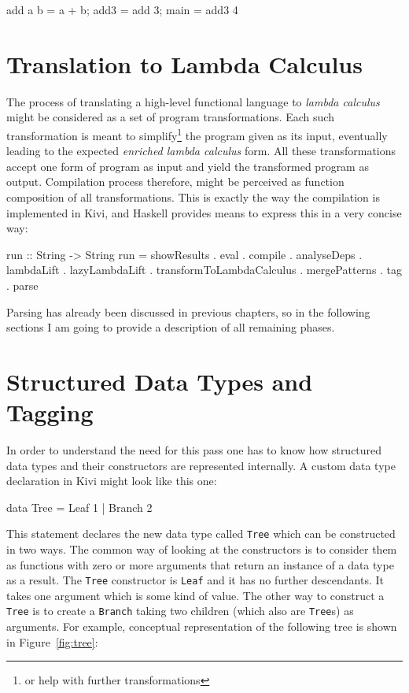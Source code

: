 \documentclass[12pt,a4paper]{report}
\begin{document}
\vspace*{0.2in}
\begin{code}[style=haskell,caption={Partial application of addition.}]
  add a b = a + b;
  add3 = add 3;
  main = add3 4
\end{code}

\section{Translation to Lambda Calculus}
The process of translating a high-level functional language to \textit{lambda
calculus} might be considered as a set of program transformations. Each such
transformation is meant to simplify\footnote{or help with further
transformations} the program given as its input, eventually leading to the
expected \textit{enriched lambda calculus} form. All these transformations
accept one form of program as input and yield the transformed program as
output. Compilation process therefore, might be perceived as function
composition of all transformations. This is exactly the way the compilation is
implemented in Kivi, and Haskell provides means to express this in a very
concise way:

\vspace*{0.2in}
\begin{code}[style=haskell]
  run :: String -> String
  run = showResults
      . eval
      . compile
      . analyseDeps
      . lambdaLift
      . lazyLambdaLift
      . transformToLambdaCalculus
      . mergePatterns
      . tag
      . parse
\end{code}

Parsing has already been discussed in previous chapters, so in the following
sections I am going to provide a description of all remaining phases.

\section{Structured Data Types and Tagging}
In order to understand the need for this pass one has to know how structured
data types and their constructors are represented internally.
A custom data type declaration in Kivi might look like this one:

\vspace*{0.2in}
\begin{code}[style=haskell]
  data Tree = Leaf 1 | Branch 2
\end{code}

This statement declares the new data type called \texttt{Tree} which can be
constructed in two ways. The common way of looking at the constructors is to
consider them as functions with zero or more arguments that return an instance
of a data type as a result. The \texttt{Tree} constructor is \texttt{Leaf} and
it has no further descendants. It takes one argument which is some kind of
value. The other way to construct a \texttt{Tree} is to create a \texttt{Branch}
taking two children (which also are \texttt{Tree}s) as arguments. For example,
conceptual representation of the following tree is shown in Figure~\ref{fig:tree}:
\end{document}
